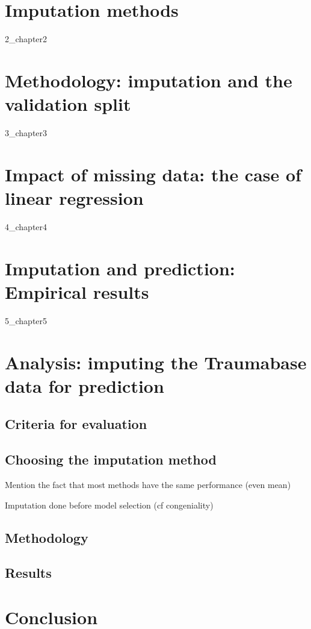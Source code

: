 \documentclass[12pt, a4paper]{memoir}
\begin{document}
\chapter{Imputation methods}
\label{imputation}
{2_chapter2}
		
\chapter{Methodology: imputation and the validation split}
\label{validation}
{3_chapter3}
		
		
\chapter{Impact of missing data: the case of linear regression}
\label{linreg}
{4_chapter4} 

\chapter{Imputation and prediction: Empirical results}
\label{empirical}
{5_chapter5}

\chapter{Analysis: imputing the Traumabase data for prediction}
\label{analysis}
	\section{Criteria for evaluation}
	\section{Choosing the imputation method}
		Mention the fact that most methods have the same performance (even mean)
		
		Imputation done before model selection (cf congeniality)
	\section{Methodology}
	
	\section{Results}
	\label{results}

\chapter*{Conclusion}


\end{document}
